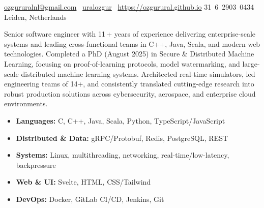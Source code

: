 \documentclass[10pt,a4paper]{article}
\begin{document}
\sloppy  %

\renewcommand\labelitemi{$\vcenter{\hbox{\tiny$\bullet$}}$}


\nobreakvspace{0.1em}

\href{mailto:ozgururalnl@gmail.com}{ozgururalnl@gmail.com} \hfill \textsmaller{\textbar} \hfill
\faLinkedinSquare\ \href{https://www.linkedin.com/in/uralozgur/}{uralozgur} \hfill \textsmaller{\textbar} \hfill
\faGithub\ \href{https://ozgurural.github.io/}{https://ozgurural.github.io} \hfill \textsmaller{\textbar}
\hfill \textsmaller{+}31\ 6\ 2903\ 0434 \hfill \textsmaller{\textbar}
\hfill Leiden, Netherlands

\spacedhrule{0.2em}{0.2em}


Senior software engineer with 11\,+ years of experience delivering enterprise-scale systems and leading cross-functional teams in C++, Java, Scala, and modern web technologies. Completed a PhD (August 2025) in Secure \& Distributed Machine Learning, focusing on proof-of-learning protocols, model watermarking, and large-scale distributed machine learning systems. Architected real-time simulators, led engineering teams of 14+, and consistently translated cutting-edge research into robust production solutions across cybersecurity, aerospace, and enterprise cloud environments.

\spacedhrule{0.9em}{0.1em}
\begin{itemize}[leftmargin=*]
  \item \textbf{Languages:} C, C++, Java, Scala, Python, TypeScript/JavaScript
  \item \textbf{Distributed \& Data:} gRPC/Protobuf, Redis, PostgreSQL, REST
  \item \textbf{Systems:} Linux, multithreading, networking, real-time/low-latency, backpressure
  \item \textbf{Web \& UI:} Svelte, HTML, CSS/Tailwind
  \item \textbf{DevOps:} Docker, GitLab CI/CD, Jenkins, Git
\end{itemize}
\end{document}

